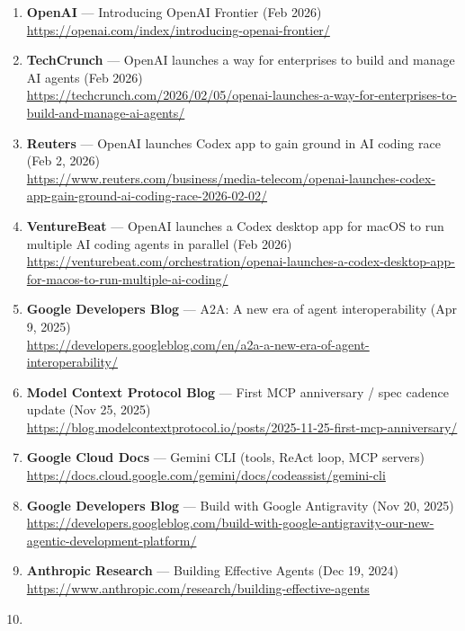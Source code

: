 \documentclass[
]{article}
\providecommand{\tightlist}{%
  \setlength{\itemsep}{0pt}\setlength{\parskip}{0pt}}
\begin{document}
\begin{enumerate}
\def\labelenumi{\arabic{enumi}.}
\tightlist
\item
  \textbf{OpenAI} --- Introducing OpenAI Frontier (Feb 2026)\\
  \url{https://openai.com/index/introducing-openai-frontier/}
\item
  \textbf{TechCrunch} --- OpenAI launches a way for enterprises to build
  and manage AI agents (Feb 2026)\\
  \url{https://techcrunch.com/2026/02/05/openai-launches-a-way-for-enterprises-to-build-and-manage-ai-agents/}
\item
  \textbf{Reuters} --- OpenAI launches Codex app to gain ground in AI
  coding race (Feb 2, 2026)\\
  \url{https://www.reuters.com/business/media-telecom/openai-launches-codex-app-gain-ground-ai-coding-race-2026-02-02/}
\item
  \textbf{VentureBeat} --- OpenAI launches a Codex desktop app for macOS
  to run multiple AI coding agents in parallel (Feb 2026)\\
  \url{https://venturebeat.com/orchestration/openai-launches-a-codex-desktop-app-for-macos-to-run-multiple-ai-coding/}
\item
  \textbf{Google Developers Blog} --- A2A: A new era of agent
  interoperability (Apr 9, 2025)\\
  \url{https://developers.googleblog.com/en/a2a-a-new-era-of-agent-interoperability/}
\item
  \textbf{Model Context Protocol Blog} --- First MCP anniversary / spec
  cadence update (Nov 25, 2025)\\
  \url{https://blog.modelcontextprotocol.io/posts/2025-11-25-first-mcp-anniversary/}
\item
  \textbf{Google Cloud Docs} --- Gemini CLI (tools, ReAct loop, MCP
  servers)\\
  \url{https://docs.cloud.google.com/gemini/docs/codeassist/gemini-cli}
\item
  \textbf{Google Developers Blog} --- Build with Google Antigravity (Nov
  20, 2025)\\
  \url{https://developers.googleblog.com/build-with-google-antigravity-our-new-agentic-development-platform/}
\item
  \textbf{Anthropic Research} --- Building Effective Agents (Dec 19,
  2024)\\
  \url{https://www.anthropic.com/research/building-effective-agents}
\item

\end{enumerate}
\end{document}
